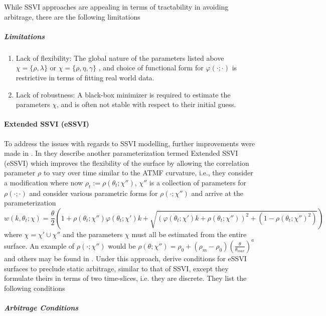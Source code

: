 \documentclass[11pt,letterpaper]{article}
\begin{document}
While SSVI approaches are appealing in terms of tractability in avoiding arbitrage, there are the following limitations
\subparagraph{Limitations}
\begin{enumerate}
\item Lack of flexibility: The global nature of the parameters listed above $\chi = \{\rho, \lambda\}$ or $\chi = \{\rho, \eta, \gamma  \} $ , and choice of functional form for $\varphi(\cdot; \cdot )$ is restrictive in terms of fitting real world data.
\item Lack of robustness: A black-box minimizer is required to estimate the parameters $\chi$, and is often not stable with respect to their initial guess. 
\end{enumerate}

\paragraph{Extended SSVI (eSSVI)}
To address the issues with regards to SSVI modelling, further improvements were made in \cite{hendriks2017extended}. In \cite{hendriks2017extended} they describe another parameterization termed Extended SSVI (eSSVI) which improves the flexibility of the surface by allowing the correlation parameter $\rho$ to vary over time similar to the ATMF curvature, i.e., they consider a modification where now $\rho_t := \rho(\theta_t; \chi'')$, $\chi''$ is a collection of parameters for $\rho(\cdot;\cdot)$ and consider various parametric forms for $\rho(\cdot; \chi'')$ and arrive at the parameterization
\[
w(k,\theta_t;\chi) = \frac{\theta}{2}\left( 1 + \rho(\theta_t;\chi'') \varphi(\theta_t;\chi')k + \sqrt{ (\varphi(\theta_t;\chi') k + \rho(\theta_t;\chi''))^2 + (1 - \rho(\theta_t;\chi'')^2 )   }     \right)
\]
where $\chi = \chi' \cup \chi'' $ and the parameters $\chi$ must all be estimated from the entire surface. An example of $\rho(\cdot; \chi'')$ would be $\rho(\theta;\chi'') = \rho_0 + (\rho_m - \rho_0) \left(\frac{\theta}{\theta_{max}} \right)^a$ and others may be found in \cite{hendriks2017extended}. Under this approach, \cite{hendriks2017extended} derive conditions for eSSVI surfaces to preclude static arbitrage, similar to that of SSVI, except they formulate theirs in terms of two time-slices, i.e. they are discrete. They list the  following conditions
\subparagraph{Arbitrage Conditions}
\end{document}
